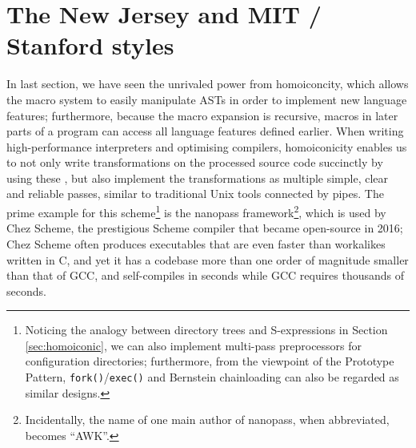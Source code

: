 \section{The New Jersey and MIT / Stanford styles}\label{sec:wib}

In last section, we have seen the unrivaled power from homoiconcity, which
allows the macro system to easily manipulate ASTs in order to implement new
language features; furthermore, because the macro expansion is recursive,
macros in later parts of a program can access all language features defined
earlier.  When writing high-performance interpreters and optimising compilers,
homoiconicity enables us to not only write transformations on the processed
source code succinctly by using these , but also
implement the transformations as multiple simple, clear and reliable passes,
similar to traditional Unix tools connected by pipes.  The prime example for
this  scheme\footnote{\label{fn:slew}Noticing
the analogy between directory trees and S-expressions in Section~%
\ref{sec:homoiconic}, we can also implement multi-pass preprocessors for
configuration directories; furthermore, from the
viewpoint of the Prototype Pattern, \texttt{fork()}/\texttt{exec()} and
Bernstein chainloading can also be regarded as similar designs.} is the
nanopass framework\footnote{Incidentally, the
name of one main author of nanopass, when abbreviated, becomes ``AWK''.},
which is used by Chez Scheme, the prestigious Scheme
compiler that became open-source in 2016; Chez Scheme often produces
executables that are even faster than workalikes written in C, and yet it
has a codebase more than one order of magnitude smaller than that of GCC,
and self-compiles in seconds while GCC requires thousands of seconds.

